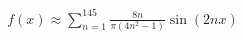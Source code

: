 \documentclass[preview]{standalone}
\begin{document}
\begin{align*}
f(x) \approx \sum_{n=1}^{145} \frac{8n}{\pi(4n^2-1)} \sin(2nx)
\end{align*}
\end{document}
